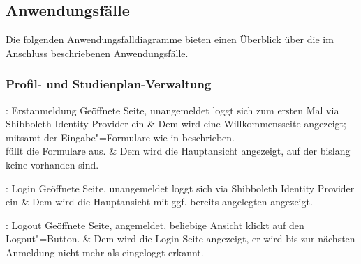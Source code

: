 \subsection{Anwendungsfälle}

Die folgenden Anwendungsfalldiagramme bieten einen Überblick über die im Anschluss beschriebenen Anwendungsfälle.

\begin{center}
	\resizebox{\textwidth}{!} {
		
	}
\end{center}

\begin{center}	
	\resizebox{\textwidth}{!} {
		
	}
\end{center}


\subsubsection{Profil- und Studienplan-Verwaltung}

\begin{usecase}{: Erstanmeldung}
	{Geöffnete Seite, unangemeldet}
	 loggt sich zum ersten Mal via \gls{Shibboleth Identity Provider} ein
	& Dem  wird eine Willkommensseite angezeigt; mitsamt der Eingabe"=Formulare wie in  beschrieben.\\ 
	\hline
	 füllt die Formulare aus.
	& Dem  wird die Hauptansicht angezeigt, auf der bislang keine  vorhanden sind. 	
\end{usecase}

\begin{usecase}{: Login}
	{Geöffnete Seite, unangemeldet}
	 loggt sich via \gls{Shibboleth Identity Provider} ein
	& Dem  wird die Hauptansicht mit ggf. bereits angelegten  angezeigt.
\end{usecase}

\begin{usecase}{: Logout}
	{Geöffnete Seite, angemeldet, beliebige Ansicht}
	 klickt auf den Logout"=Button.
	& Dem  wird die Login-Seite angezeigt, er wird bis zur nächsten Anmeldung nicht mehr als eingeloggt erkannt.
\end{usecase}

